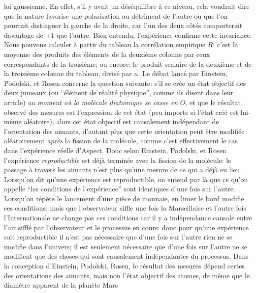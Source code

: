 loi gaussienne. En effet, s'il y avait un d\'es\'equilibre \`a ce niveau, cela 
voudrait dire que la nature favorise une polarisation au d\'etriment de 
l'autre ou que l'on pourrait distinguer la gauche de la droite, car l'un des 
deux c\^ot\'es comporterait davantage de $+1$ que l'autre.  
Bien entendu, l'exp\'erience confirme cette invariance.  
\medskip 
Nous pouvons calculer \`a partir du tableau la corr\'elation empirique 
$R$: c'est la moyenne des produits des \'el\'ements de la deuxi\`eme 
colonne par ceux correspondants de la troisi\`eme; ou encore: le produit 
scalaire de la deuxi\`eme et de la troisi\`eme colonne du tableau,  
divis\'e par $n$.  
\medskip 
Le d\'ebat lanc\'e par Einstein, Podolski, et Rosen concerne la question  
suivante: s'il se cr\'ee un \'etat objectif des deux jumeaux (ou 
``\'el\'ement de r\'ealit\'e physique'', comme ils disent dans leur article) 
{\it au moment o\`u la mol\'ecule diatomique se casse en} $O$, et que le 
r\'esultat observ\'e des mesures est l'expression de cet \'etat (peu  
importe si l'\'etat cr\'e\'e est lui-m\^eme al\'eatoire), alors cet \'etat 
objectif est causalement ind\'ependant de l'orientation des aimants, 
d'autant plus que cette orientation peut \^etre mo\-di\-fi\'ee al\'eatoirement 
{\it apr\`es} la fission de la mol\'ecule,  comme  c'est effectivement le 
cas dans l'exp\'erience r\'eelle d'Aspect. Donc selon Einstein, Podolski, et 
Rosen l'exp\'erience {\it reproductible} est d\'ej\`a termin\'ee avec la 
fission de  la mol\'ecule: le passage \`a travers les aimants n'est plus 
qu'une mesure de ce qui a d\'ej\`a eu lieu.  
\medskip 
Lorsqu'on dit qu'une exp\'erience est reproductible, on entend par l\`a  
 que  ce qu'on appelle ``les conditions de l'exp\'erience'' sont identiques 
d'une fois sur l'autre. Lorsqu'on r\'ep\`ete le lancement d'une pi\`ece de 
monnaie, en limer le bord modifie ces conditions; mais que 
l'observateur siffle une fois la Marseillaise et l'autre fois  
l'Internationale ne change pas ces conditions  car il y a ind\'ependance 
causale entre l'air siffl\'e par l'observateur et le processus en cours:  
donc pour qu'une exp\'erience soit reproductible il n'est pas n\'ecessaire 
que d'une fois sur l'autre rien ne se modifie dans l'univers; il est  
seulement n\'ecessaire que d'une fois sur l'autre ne se modifient que  
des choses qui sont causalement  ind\'ependantes du processus. 
\medskip 
Dans la conception d'Einstein, Podolski, Rosen, le r\'esultat des mesures 
d\'epend certes des orientations des aimants, mais non l'\'etat objectif  
des atomes, de m\^eme que le diam\`etre apparent de la plan\`ete Mars 
